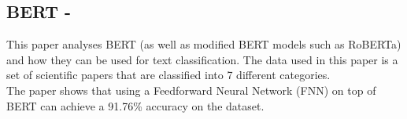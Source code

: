 \documentclass[a4paper,fleqn,10pt]{article}
\begin{document}


\subsection{BERT - \cite{bertmodelling}}
This paper analyses BERT (as well as modified BERT models such as RoBERTa) and how they can be used for text classification.
The data used in this paper is a set of scientific papers that are classified into 7 different categories.\\

The paper shows that using a Feedforward Neural Network (FNN) on top of BERT can achieve a 91.76\% accuracy on the dataset.
\newpage
\end{document}
